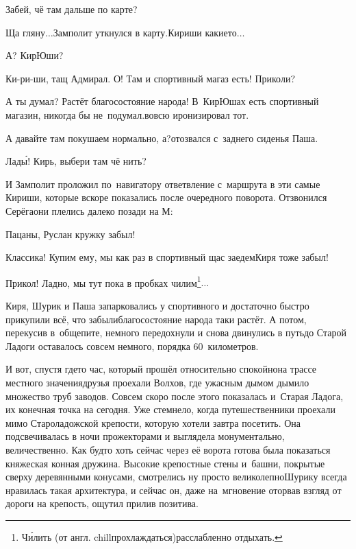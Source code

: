\diagdash Забей, чё там дальше по карте?

\diagdash Ща гляну$\ldots$\mdash Замполит уткнулся в карту.\mdash Кириши какие\sdash то$\ldots$

\diagdash А? КирЮши?

\diagdash Ки-ри-ши, тащ Адмирал. О! Там и спортивный магаз есть! Приколи?

\diagdash А ты думал? Растёт благосостояние народа! В~КирЮшах есть спортивный магазин, никогда бы не~подумал.\mdash вовсю иронизировал тот.

\diagdash А давайте там покушаем нормально, а?\mdash отозвался с~заднего сиденья Паша.

\diagdash Лад\'{ы}! Кирь, выбери там чё нить?

И Замполит проложил по~навигатору ответвление с~маршрута в эти самые Кириши, которые вскоре показались после очередного поворота. Отзвонился Серёга\mdash они плелись далеко позади на М:

\diagdash Пацаны, Руслан кружку забыл!

\diagdash Классика! Купим ему, мы как раз в спортивный щас заедем\mdash Киря тоже забыл!

\renewcommand*{\thefootnote}{\fnsymbol{footnote}}
\setcounter{footnote}{0}
\diagdash Прикол! Ладно, мы тут пока в пробках чилим\footnote{Ч\'{и}лить (от англ. chill\mdash прохлаждаться)\mdash расслабленно отдыхать.}$\ldots$

Киря, Шурик и Паша запарковались у спортивного и достаточно быстро прикупили всё, что забыли\mdash благосостояние народа таки растёт. А потом, перекусив в~общепите, немного передохнули и снова двинулись в путь\mdash до Старой Ладоги оставалось совсем немного, порядка 60~километров.

И вот, спустя где\sdash то час, который прошёл относительно спокойно\mdash на трассе местного значения\mdash друзья проехали Волхов, где ужасным дымом дымило множество труб заводов. Совсем скоро после этого показалась и~Старая Ладога, их конечная точка на сегодня. Уже стемнело, когда путешественники проехали мимо Староладожской крепости, которую хотели завтра посетить. Она подсвечивалась в ночи прожекторами и выглядела монументально, величественно. Как будто хоть сейчас через её ворота готова была показаться княжеская конная дружина. Высокие крепостные стены и~башни, покрытые сверху деревянными конусами, смотрелись ну просто великолепно\mdash Шурику всегда нравилась такая архитектура, и сейчас он, даже на~мгновение оторвав взгляд от дороги на крепость, ощутил прилив позитива. 

